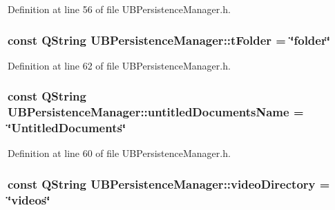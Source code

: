 Definition at line 56 of file U\-B\-Persistence\-Manager.\-h.

\hypertarget{class_u_b_persistence_manager_a904c350945d0fd7cf109e939822d5fe3}{
\subsubsection[{t\-Folder}]{\setlength{\rightskip}{0pt plus 5cm}const Q\-String U\-B\-Persistence\-Manager\-::t\-Folder = \char`\"{}folder\char`\"{}\hspace{0.3cm}{\ttfamily [static]}}}\label{d0/dd5/class_u_b_persistence_manager_a904c350945d0fd7cf109e939822d5fe3}


Definition at line 62 of file U\-B\-Persistence\-Manager.\-h.

\hypertarget{class_u_b_persistence_manager_a785a394deaab51518902d5afbfcc694b}{
\subsubsection[{untitled\-Documents\-Name}]{\setlength{\rightskip}{0pt plus 5cm}const Q\-String U\-B\-Persistence\-Manager\-::untitled\-Documents\-Name = \char`\"{}Untitled\-Documents\char`\"{}\hspace{0.3cm}{\ttfamily [static]}}}\label{d0/dd5/class_u_b_persistence_manager_a785a394deaab51518902d5afbfcc694b}


Definition at line 60 of file U\-B\-Persistence\-Manager.\-h.

\hypertarget{class_u_b_persistence_manager_a6d2a1dff335f20f14fba15798c778aa7}{
\subsubsection[{video\-Directory}]{\setlength{\rightskip}{0pt plus 5cm}const Q\-String U\-B\-Persistence\-Manager\-::video\-Directory = \char`\"{}videos\char`\"{}\hspace{0.3cm}{\ttfamily [static]}}}\label{d0/dd5/class_u_b_persistence_manager_a6d2a1dff335f20f14fba15798c778aa7}


